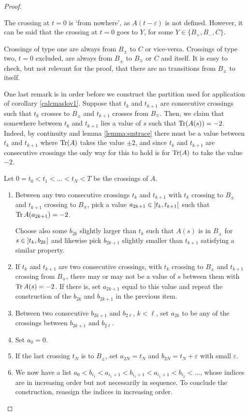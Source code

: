 \begin{proof}
\begin{definition}
The crossing at $t = 0$ is `from nowhere', as $A(t-\varepsilon)$ is not defined. However, it can be said that the crossing at $t = 0$ goes to $Y$, for some $Y \in \{B_+, B_-, C\}$.
\end{definition}

Crossings of type one are always from $B_\pm$ to $C$ or vice-versa. Crossings of type two, $t=0$ excluded, are always from $B_{\pm}$ to $B_{\mp}$ or $C$ and itself. It is easy to check, but not relevant for the proof, that there are no transitions from $B_\pm$ to itself.

One last remark is in order before we construct the partition used for application of corollary \ref{calcmaslov1}. Suppose that $t_k$ and $t_{k+1}$ are consecutive crossings such that $t_k$ crosses to $B_{\pm}$ and $t_{k+1}$ crosses from $B_{\mp}$. Then, we claim that somewhere between $t_k$ and $t_{k+1}$ lies a value of $s$ such that $\operatorname{Tr}(A(s)) = -2$. Indeed, by continuity and lemma \ref{lemma:smtrace} there must be a value between $t_k$ and $t_{k+1}$ where $\operatorname{Tr}(A)$ takes the value $\pm 2$, and since $t_k$ and $t_{k+1}$ are consecutive crossings the only way for this to hold is for $\operatorname{Tr}(A)$ to take the value $-2$.



\begin{algorithm}\label{alg:p}
Let $0 = t_0 < t_1 < \dots < t_N < T$ be the crossings of $A$.
\begin{enumerate}[algorithm]
\item\label{alg:pstep1} Between any two consecutive crossings $t_k$ and $t_{k+1}$ with $t_k$ crossing to $B_{\pm}$ and $t_{k+1}$ crossing to $B_{\mp}$, pick a value $a_{2k+1} \in \ointerval{t_k}{t_{k+1}}$ such that $\operatorname{Tr} A(a_{2k+1}) = -2$.

Choose also some $b_{2k}$ slightly larger than $t_k$ such that $A(s)$ is in $B_{\pm}$ for $s \in \linterval{t_k}{b_{2k}}$ and likewise pick $b_{2k+1}$ slightly smaller than $t_{k+1}$ satisfying a similar property.
\item\label{alg:pstep2} If $t_k$ and $t_{k+1}$ are two consecutive crossings, with $t_k$ crossing to $B_{\pm}$ and $t_{k+1}$ crossing from $B_{\mp}$, there may or may not be a value of $s$ between them with $\operatorname{Tr} A(s) = -2$. If there is, set $a_{2k+1}$ equal to this value and repeat the construction of the $b_{2k}$ and $b_{2k+1}$ in the previous item.
\item Between two consecutive $b_{2k+1}$ and $b_{2\ell}$, $k<\ell$, set $a_{2k}$ to be any of the crossings between $b_{2k+1}$ and $b_{2\ell}$.
\item Set $a_0 = 0$.
\item\label{alg:pprelast} If the last crossing $t_N$ is to $B_{\pm}$, set $a_{2N} = t_N$ and $b_{2N} = t_N + \varepsilon$ with small $\varepsilon$.
\item We now have a list $a_0 < b_{i_1} < a_{i_1+1} < b_{i_1 + 1} < a_{i_1+1} < b_{i_2} < \dots$, whose indices are in increasing order but not necessarily in sequence. To conclude the construction, reassign the indices in increasing order.
\end{enumerate}
\end{algorithm}


\end{proof}
